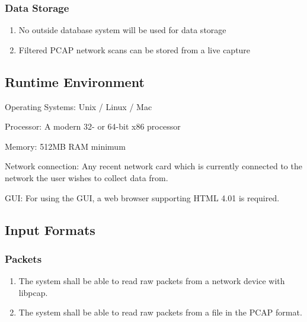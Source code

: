 \documentclass[titlepage]{article}
\begin{document}

\subsubsection{Data Storage%
  \label{data-storage}%
}
  \begin{enumerate}
    \item No outside database system will be used for data storage
    \item Filtered PCAP network scans can be stored from a live capture
  \end{enumerate}


\subsection{Runtime Environment} 
\begin{itemize*}
    \item Operating Systems:  Unix / Linux / Mac
    \item Processor:  A modern 32- or 64-bit x86 processor
    \item Memory:  512MB RAM minimum
    \item Network connection:  Any recent network card which is currently connected to the network the user wishes to collect data from.
    \item GUI:  For using the GUI, a web browser supporting HTML 4.01 is required.
\end{itemize*}


\subsection{Input Formats%
  \label{input-formats}%
}

\subsubsection{Packets}
\begin{enumerate}
    \item The system shall be able to read raw packets from a network device
        with libpcap.
    \item The system shall be able to read raw packets from a file in the PCAP
        format.
\end{enumerate}
\end{document}
